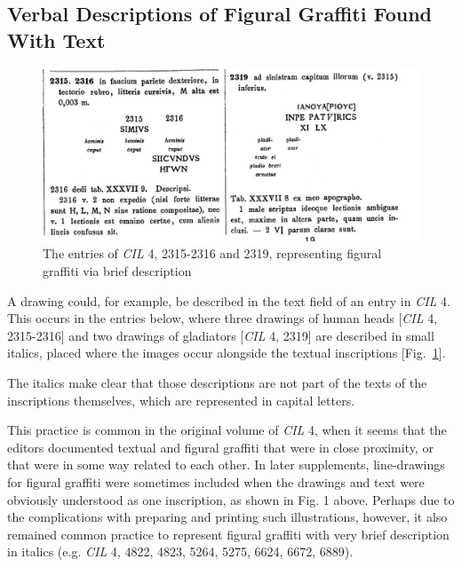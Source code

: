 \documentclass[amsthm,ebook]{saparticle}
\begin{document}
\subsection{Verbal Descriptions of Figural Graffiti Found With Text}

\begin{figure}[!bp]
\centering
 \includegraphics[scale=0.15]{EAGLE2016BenefielSypniewski-img002.jpg}
\caption{The entries of \emph{CIL} 4, 2315-2316 and 2319, representing figural graffiti via brief description}
\label{fig:2}
\end{figure}


A drawing could, for example, be described in the text field of an entry in \emph{CIL} 4. This occurs in the entries below,
where three drawings of human heads [\emph{CIL} 4, 2315-2316] and two drawings of gladiators [\emph{CIL} 4, 2319] are described in
small italics, placed where the images occur alongside the textual inscriptions [Fig.~\ref{fig:2}]. 



The italics make clear that those descriptions are not part of the texts of the inscriptions themselves, which are
represented in capital letters.




This practice is common in the original volume of \emph{CIL} 4, when it seems that the editors documented textual and
figural graffiti that were in close proximity, or that were in some way related to each other. In later supplements,
line-drawings for figural graffiti were sometimes included when the drawings and text were obviously understood as one
inscription, as shown in Fig. 1 above. Perhaps due to the complications with preparing and printing such
illustrations, however, it also remained common practice to represent figural graffiti with very brief description in
italics (e.g. \emph{CIL} 4, 4822, 4823, 5264, 5275, 6624, 6672, 6889). 
\end{document}
